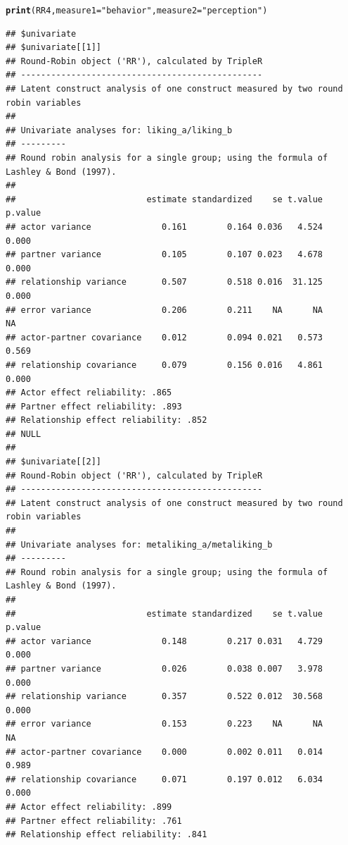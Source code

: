 \documentclass[a4paper]{article}\usepackage[]{graphicx}\usepackage[]{color}
\makeatletter
\newcommand{\hlstr}[1]{\textcolor[rgb]{0.192,0.494,0.8}{#1}}%
\newcommand{\hlstd}[1]{\textcolor[rgb]{0.345,0.345,0.345}{#1}}%
\newcommand{\hlkwc}[1]{\textcolor[rgb]{0.333,0.667,0.333}{#1}}%
\newcommand{\hlkwd}[1]{\textcolor[rgb]{0.737,0.353,0.396}{\textbf{#1}}}%
\newenvironment{kframe}{%
 \def\at@end@of@kframe{}%
 \ifinner\ifhmode%
  \def\at@end@of@kframe{\end{minipage}}%
  \begin{minipage}{\columnwidth}%
 \fi\fi%
 \def\FrameCommand##1{\hskip\@totalleftmargin \hskip-\fboxsep
 \colorbox{shadecolor}{##1}\hskip-\fboxsep
     \hskip-\linewidth \hskip-\@totalleftmargin \hskip\columnwidth}%
 \MakeFramed {\advance\hsize-\width
   \@totalleftmargin\z@ \linewidth\hsize
   \@setminipage}}%
 {\par\unskip\endMakeFramed%
 \at@end@of@kframe}
\newenvironment{knitrout}{}{} %
\makeatother
\begin{document}
\par\vspace{5mm}

\begin{knitrout}\small
{}\color{fgcolor}\begin{kframe}
\begin{alltt}
\hlkwd{print}\hlstd{(RR4,} \hlkwc{measure1} \hlstd{=} \hlstr{"behavior"}\hlstd{,} \hlkwc{measure2} \hlstd{=} \hlstr{"perception"}\hlstd{)}
\end{alltt}
\begin{verbatim}
## $univariate
## $univariate[[1]]
## Round-Robin object ('RR'), calculated by TripleR
## ------------------------------------------------
## Latent construct analysis of one construct measured by two round robin variables
## 
## Univariate analyses for: liking_a/liking_b 
## ---------
## Round robin analysis for a single group; using the formula of Lashley & Bond (1997).
## 
##                          estimate standardized    se t.value p.value
## actor variance              0.161        0.164 0.036   4.524   0.000
## partner variance            0.105        0.107 0.023   4.678   0.000
## relationship variance       0.507        0.518 0.016  31.125   0.000
## error variance              0.206        0.211    NA      NA      NA
## actor-partner covariance    0.012        0.094 0.021   0.573   0.569
## relationship covariance     0.079        0.156 0.016   4.861   0.000
## Actor effect reliability: .865 
## Partner effect reliability: .893 
## Relationship effect reliability: .852 
## NULL
## 
## $univariate[[2]]
## Round-Robin object ('RR'), calculated by TripleR
## ------------------------------------------------
## Latent construct analysis of one construct measured by two round robin variables
## 
## Univariate analyses for: metaliking_a/metaliking_b 
## ---------
## Round robin analysis for a single group; using the formula of Lashley & Bond (1997).
## 
##                          estimate standardized    se t.value p.value
## actor variance              0.148        0.217 0.031   4.729   0.000
## partner variance            0.026        0.038 0.007   3.978   0.000
## relationship variance       0.357        0.522 0.012  30.568   0.000
## error variance              0.153        0.223    NA      NA      NA
## actor-partner covariance    0.000        0.002 0.011   0.014   0.989
## relationship covariance     0.071        0.197 0.012   6.034   0.000
## Actor effect reliability: .899 
## Partner effect reliability: .761 
## Relationship effect reliability: .841 

\end{verbatim}
\end{kframe}
\end{knitrout}
\end{document}
